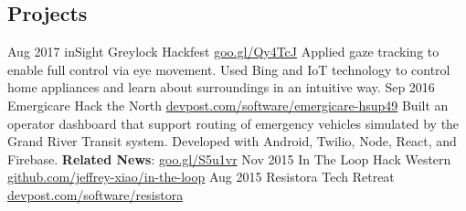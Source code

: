 \documentclass{resume}
\begin{document}
\begin{main}
    \section{Projects}
      \begin{entrylist}
        \rightentry%
          {Aug 2017}%
          {inSight}%
          {Greylock Hackfest}%
          {\href{https://goo.gl/Qy4TcJ}{goo.gl/Qy4TcJ}}%
          {%
          {%
            Applied gaze tracking to enable full control via eye movement. %
          }%
          {%
            Used Bing and IoT technology to control home appliances and learn about surroundings %
            in an intuitive way. %
          }}
        \rightentry%
          {Sep 2016}%
          {Emergicare}%
          {Hack the North}%
          {\href{https://devpost.com/software/emergicare-hsup49}{devpost.com/software/emergicare-hsup49}}%
          {%
          {%
            Built an operator  dashboard that support routing of emergency vehicles simulated by %
            the Grand River Transit system. %
          }%
          {%
            Developed with Android, Twilio, Node, React, and Firebase. %
          }%
          {%
            \textbf{Related News}: \color{lightred}\href{https://goo.gl/S5u1vr}{goo.gl/S5u1vr}%
          }}
        \rightentry%
          {Nov 2015}%
          {In The Loop}%
          {Hack Western}%
          {\href{https://github.com/jeffrey-xiao/in-the-loop}{github.com/jeffrey-xiao/in-the-loop}}%
          {}
        \rightentry%
          {Aug 2015}%
          {Resistora}%
          {Tech Retreat}%
          {\href{https://devpost.com/software/resistora}{devpost.com/software/resistora}}%
          {}
      \end{entrylist}
  \end{main}
\end{document}
